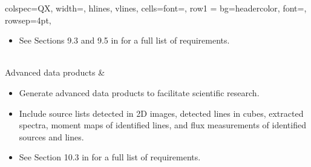 \begin{center}
\begin{talltblr}[caption={Enhanced and new user services to support WSU science.},label=tab:uid,]{
  colspec={QX},
  width=\textwidth,
  hlines,
  vlines,
  cells={font=\linespread{0.5}\small},
  row{1} = {bg=headercolor, font=\small\bfseries},
  rowsep=4pt,
  }
\begin{minipage}{10cm}
\begin{itemize}[leftmargin=0.3cm, rightmargin=0.3cm,itemsep=0em]
\item See Sections 9.3 and 9.5 in \cite{uid} for a full list of requirements.
\end{itemize}
\end{minipage}\\
%
Advanced data products     & 
\begin{minipage}{10cm}
\begin{itemize}[leftmargin=0.3cm,rightmargin=0.3cm,itemsep=0em]
\item Generate advanced data products to facilitate scientific research.
\item Include source lists detected in 2D images, detected lines in cubes, extracted spectra, moment maps of identified lines, and flux measurements of identified sources and lines.
\item See Section 10.3 in \cite{uid} for a full list of requirements.
\end{itemize}
\end{minipage}\\
\end{talltblr}
\end{center}